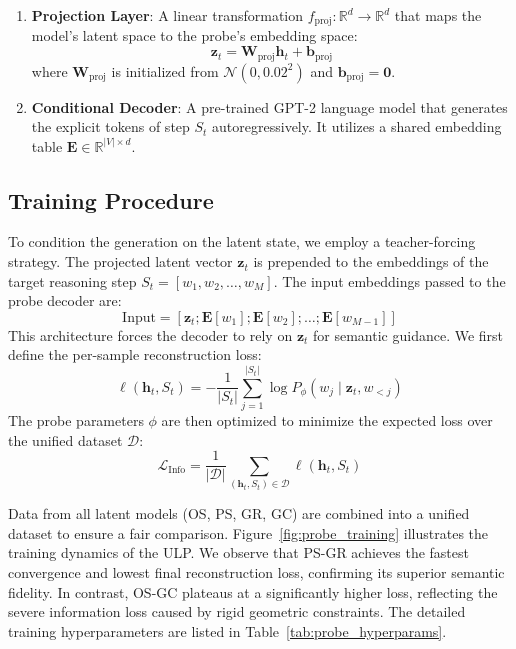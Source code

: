 \begin{enumerate}
    \item \textbf{Projection Layer}: A linear transformation $f_\text{proj}: \mathbb{R}^d \rightarrow \mathbb{R}^d$ that maps the model's latent space to the probe's embedding space:
    \begin{equation}
        \mathbf{z}_t = \mathbf{W}_\text{proj} \mathbf{h}_t + \mathbf{b}_\text{proj}
    \end{equation}
    where $\mathbf{W}_\text{proj}$ is initialized from $\mathcal{N}(0, 0.02^2)$ and $\mathbf{b}_\text{proj} = \mathbf{0}$.
    
    \item \textbf{Conditional Decoder}: A pre-trained GPT-2 language model that generates the explicit tokens of step $S_t$ autoregressively. It utilizes a shared embedding table $\mathbf{E} \in \mathbb{R}^{|V| \times d}$.
\end{enumerate}

\subsection{Training Procedure}

To condition the generation on the latent state, we employ a teacher-forcing strategy. The projected latent vector $\mathbf{z}_t$ is prepended to the embeddings of the target reasoning step $S_t = [w_1, w_2, \ldots, w_M]$. The input embeddings passed to the probe decoder are:
\begin{equation}
    \text{Input} = [\mathbf{z}_t; \mathbf{E}[w_1]; \mathbf{E}[w_2]; \ldots; \mathbf{E}[w_{M-1}]]
\end{equation}
This architecture forces the decoder to rely on $\mathbf{z}_t$ for semantic guidance. We first define the per-sample reconstruction loss:
\begin{equation}
    \ell(\mathbf{h}_t, S_t) = -\frac{1}{|S_t|} \sum_{j=1}^{|S_t|} \log P_\phi(w_j \mid \mathbf{z}_t, w_{<j})
\end{equation}
The probe parameters $\phi$ are then optimized to minimize the expected loss over the unified dataset $\mathcal{D}$:
\begin{equation}
    \mathcal{L}_{\text{Info}} = \frac{1}{|\mathcal{D}|} \sum_{(\mathbf{h}_t, S_t) \in \mathcal{D}} \ell(\mathbf{h}_t, S_t)
\end{equation}

Data from all latent models (OS, PS, GR, GC) are combined into a unified dataset to ensure a fair comparison. Figure~\ref{fig:probe_training} illustrates the training dynamics of the ULP. We observe that PS-GR achieves the fastest convergence and lowest final reconstruction loss, confirming its superior semantic fidelity. In contrast, OS-GC plateaus at a significantly higher loss, reflecting the severe information loss caused by rigid geometric constraints. The detailed training hyperparameters are listed in Table~\ref{tab:probe_hyperparams}.

